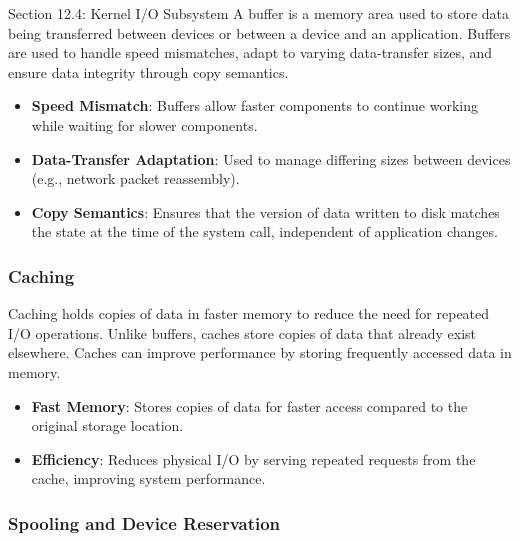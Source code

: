 \begin{notes}{Section 12.4: Kernel I/O Subsystem}
    A buffer is a memory area used to store data being transferred between devices or between a device and an application. Buffers are used to handle speed mismatches, adapt to varying data-transfer 
    sizes, and ensure data integrity through copy semantics.
    
    \begin{highlight}[Buffering]
    
        \begin{itemize}
            \item \textbf{Speed Mismatch}: Buffers allow faster components to continue working while waiting for slower components.
            \item \textbf{Data-Transfer Adaptation}: Used to manage differing sizes between devices (e.g., network packet reassembly).
            \item \textbf{Copy Semantics}: Ensures that the version of data written to disk matches the state at the time of the system call, independent of application changes.
        \end{itemize}
    
    \end{highlight}
    
    \subsubsection*{Caching}
    
    Caching holds copies of data in faster memory to reduce the need for repeated I/O operations. Unlike buffers, caches store copies of data that already exist elsewhere. Caches can improve performance 
    by storing frequently accessed data in memory.
    
    \begin{highlight}[Caching]
    
        \begin{itemize}
            \item \textbf{Fast Memory}: Stores copies of data for faster access compared to the original storage location.
            \item \textbf{Efficiency}: Reduces physical I/O by serving repeated requests from the cache, improving system performance.
        \end{itemize}
    
    \end{highlight}
    
    \subsubsection*{Spooling and Device Reservation}
    

\end{notes}
